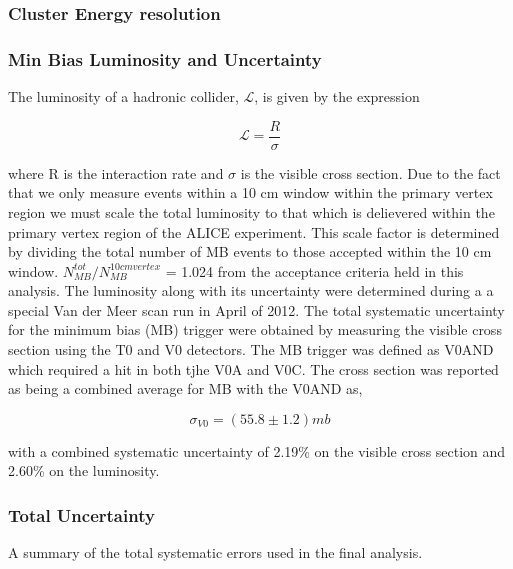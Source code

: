\subsubsection{Cluster Energy resolution}


\subsubsection{Min Bias Luminosity and Uncertainty}

The luminosity of a hadronic collider, $\mathscr{L}$, is given by the expression



\begin{equation}
\mathscr{L} = \frac{R}{\sigma}
\label{eq:xlumdef}
\end{equation}

\noindent
where R is the interaction rate and $\sigma$ is the visible cross section.  Due to the fact that we only measure events within a 10 cm window within the primary vertex region we must scale the total luminosity to that which is delievered within the primary vertex region of the ALICE experiment.  This scale factor is determined by dividing the total number of MB events to those accepted within the 10 cm window.  $N^{tot}_{MB} / N^{10 cm vertex}_{MB}$ = 1.024 from the acceptance criteria held in this analysis.
The luminosity along with its uncertainty were determined during a a special Van der Meer scan run in April of 2012\cite{ALICE-PUBLIC-2017-002}.  The total systematic uncertainty for the minimum bias (MB) trigger were obtained by measuring the visible cross section using the T0 and V0 detectors.  The MB trigger was defined as V0AND which required a hit in both tjhe V0A and V0C.  The cross section was reported as being a combined average for MB with the V0AND as, 

\begin{equation}
\sigma_{V0} = (55.8 \pm 1.2) mb
\label{eq:xlumdef}
\end{equation}

\noindent
with a combined systematic uncertainty of 2.19\% on the visible cross section and 2.60\% on the luminosity. 


\subsubsection{Total Uncertainty}

A summary of the total systematic errors used in the final analysis.


